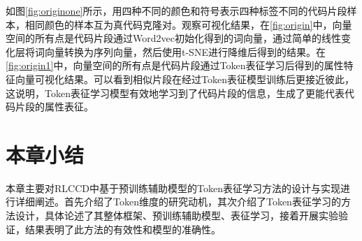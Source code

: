 如图\ref{fig:originone}所示，用四种不同的颜色和符号表示四种标签不同的代码片段样本，相同颜色的样本互为真代码克隆对。观察可视化结果，在\ref{fig:origin}中，向量空间的所有点是代码片段通过Word2vec初始化得到的词向量，通过简单的线性变化层将词向量转换为序列向量，然后使用t-SNE进行降维后得到的结果。在\ref{fig:origin1}中，向量空间的所有点是代码片段通过Token表征学习后得到的属性特征向量可视化结果。可以看到相似片段在经过Token表征模型训练后更接近彼此，这说明，Token表征学习模型有效地学习到了代码片段的信息，生成了更能代表代码片段的属性表征。

\section{本章小结}
\label{sec:Summary3}
本章主要对RLCCD中基于预训练辅助模型的Token表征学习方法的设计与实现进行详细阐述。首先介绍了Token维度的研究动机，其次介绍了Token表征学习的方法设计，具体论述了其整体框架、预训练辅助模型、表征学习，接着开展实验验证，结果表明了此方法的有效性和模型的准确性。
